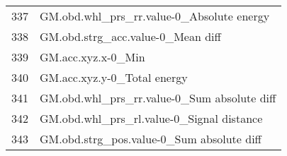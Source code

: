 \begin{tabular}{ll}
337 &          GM.obd.whl\_prs\_rr.value-0\_Absolute energy \\
338 &                  GM.obd.strg\_acc.value-0\_Mean diff \\
339 &                                 GM.acc.xyz.x-0\_Min \\
340 &                        GM.acc.xyz.y-0\_Total energy \\
341 &        GM.obd.whl\_prs\_rr.value-0\_Sum absolute diff \\
342 &          GM.obd.whl\_prs\_rl.value-0\_Signal distance \\
343 &          GM.obd.strg\_pos.value-0\_Sum absolute diff \\
\bottomrule
\end{tabular}

